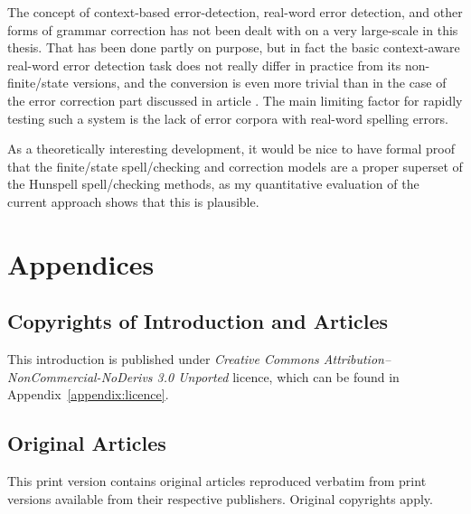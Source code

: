 \documentclass[officiallayout,final]{unihelcompling}
\newif\ifprintversion
\begin{document}
The concept of context-based error-detection, real-word error detection, and
other forms of grammar correction has not been dealt with on a very large-scale
in this thesis. That has been done partly on purpose, but in fact the basic
context-aware real-word error detection task does not really differ in practice
from its non-finite\-/state versions, and the conversion is even more trivial
than in the case of the error correction part discussed in article
. The main limiting factor for rapidly testing
such a system is the lack of error corpora with real-word spelling errors.

As a theoretically interesting development, it would be nice to have formal
proof that the finite\-/state spell\-/checking and correction models are a
proper superset of the Hunspell spell\-/checking methods, as my quantitative
evaluation of the current approach shows that this is plausible.






\appendix
\chapter{Appendices}
\section{Copyrights of Introduction and Articles}
\label{appendix:copyrights}

This introduction is published under \emph{Creative Commons
Attribution–NonCommercial-NoDerivs 3.0 Unported} licence, which can be found in
Appendix~\ref{appendix:licence}. 
\ifprintversion
The articles included
in this print version, reproduced without changes from their originals are
copyrighted property of their respective publishers.
\fi

\section{Original Articles}
\label{appendix:articles}

\ifprintversion
This print version contains original articles reproduced verbatim from print
versions available from their respective publishers. Original copyrights apply.











\end{document}
